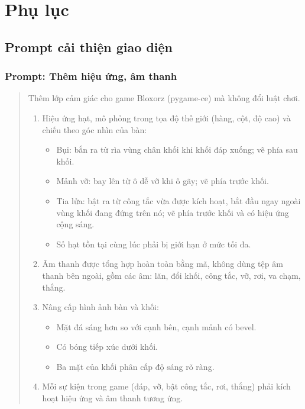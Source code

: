\chapter{Phụ lục}

\section{Prompt cải thiện giao diện}
\label{app:updateui}
 
\subsection*{Prompt: Thêm hiệu ứng, âm thanh}
\label{sec:prompt-u1}

\begin{quote}
\small
\setlength{\emergencystretch}{2em}
Thêm lớp cảm giác cho game Bloxorz (pygame-ce) mà không đổi luật chơi.

\begin{enumerate}
  \item Hiệu ứng hạt, mô phỏng trong tọa độ thế giới (hàng, cột, độ cao) và chiếu theo góc nhìn của bàn:
  \begin{itemize}
    \item Bụi: bắn ra từ rìa vùng chân khối khi khối đáp xuống; vẽ phía sau khối.
    \item Mảnh vỡ: bay lên từ ô dễ vỡ khi ô gãy; vẽ phía trước khối.
    \item Tia lửa: bật ra từ công tắc vừa được kích hoạt, bắt đầu ngay ngoài vùng khối đang đứng trên nó; vẽ phía trước khối và có hiệu ứng cộng sáng.
    \item Số hạt tồn tại cùng lúc phải bị giới hạn ở mức tối đa.
  \end{itemize}

  \item Âm thanh được tổng hợp hoàn toàn bằng mã, không dùng tệp âm thanh bên ngoài, gồm các âm: lăn, đổi khối, công tắc, vỡ, rơi, va chạm, thắng.

  \item Nâng cấp hình ảnh bàn và khối:
  \begin{itemize}
    \item Mặt đá sáng hơn so với cạnh bên, cạnh mảnh có bevel.
    \item Có bóng tiếp xúc dưới khối.
    \item Ba mặt của khối phân cấp độ sáng rõ ràng.
  \end{itemize}

  \item Mỗi sự kiện trong game (đáp, vỡ, bật công tắc, rơi, thắng) phải kích hoạt hiệu ứng và âm thanh tương ứng.
\end{enumerate}
\end{quote}


